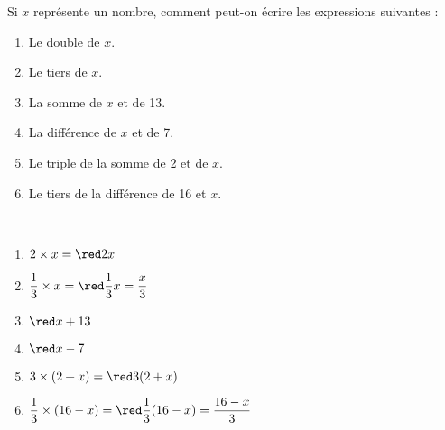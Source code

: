 \begin{exercice*}
   Si $x$ représente un nombre, comment peut-on écrire les expressions suivantes :
   \begin{enumerate}
      \item Le double de $x$.
      \item Le tiers de $x$.
      \item La somme de $x$ et de 13.
      \item La différence de $x$ et de 7.
      \item Le triple de la somme de 2 et de $x$.
      \item Le tiers de la différence de 16 et $x$.
   \end{enumerate}
\end{exercice*}
\begin{corrige}
   \ \\ [-5mm]
   \begin{enumerate}
      \item $2\times x =\red2x$ \smallskip
      \item $\dfrac13\times x =\red\dfrac13x =\dfrac{x}{3}$ \smallskip
      \item $\red x+13$
      \item $\red x-7$
      \item $3\times(2+x) =\red3(2+x)$ \smallskip
      \item $\dfrac13\times(16-x) =\red\dfrac13(16-x) =\dfrac{16-x}{3}$
   \end{enumerate}
\end{corrige}

